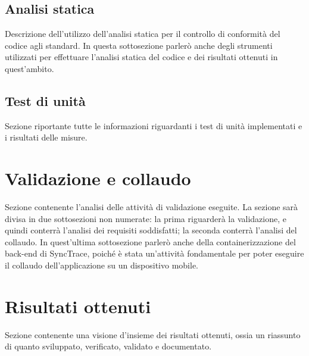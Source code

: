\subsection{Analisi statica}

Descrizione dell'utilizzo dell'analisi statica per il controllo di conformità del codice agli standard. In questa sottosezione parlerò anche degli strumenti utilizzati per effettuare l'analisi statica del codice e dei risultati ottenuti in quest'ambito.

\subsection{Test di unità}

Sezione riportante tutte le informazioni riguardanti i test di unità implementati e i risultati delle misure.


\section{Validazione e collaudo}

Sezione contenente l'analisi delle attività di validazione eseguite. La sezione sarà divisa in due sottosezioni non numerate: la prima riguarderà la validazione, e quindi conterrà l'analisi dei requisiti soddisfatti; la seconda conterrà l'analisi del collaudo. In quest'ultima sottosezione parlerò anche della containerizzazione del back-end di SyncTrace, poiché è stata un'attività fondamentale per poter eseguire il collaudo dell'applicazione su un dispositivo mobile.


\section{Risultati ottenuti}

Sezione contenente una visione d'insieme dei risultati ottenuti, ossia un riassunto di quanto sviluppato, verificato, validato e documentato.
